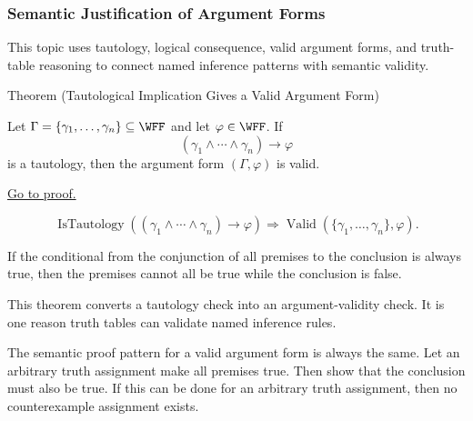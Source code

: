 \subsubsection*{Semantic Justification of Argument Forms}

\begin{remark*}
This topic uses tautology, logical consequence, valid argument forms, and
truth-table reasoning to connect named inference patterns with semantic
validity.
\end{remark*}

\begin{theorembox}{Theorem (Tautological Implication Gives a Valid Argument Form)}
\begin{theorem}
\label{thm:tautological-implication-valid-argument-form-propositional-logic}
Let \(\Gamma=\{\gamma_1,\ldots,\gamma_n\}\subseteq\WFF\) and let
\(\varphi\in\WFF\). If
\[
(\gamma_1\land\cdots\land\gamma_n)\to\varphi
\]
is a tautology, then the argument form \((\Gamma,\varphi)\) is valid.

\noindent\hyperref[prf:tautological-implication-valid-argument-form-propositional-logic]{Go to proof.}
\end{theorem}
\end{theorembox}

\begin{remark*}
\[
\operatorname{IsTautology}((\gamma_1\land\cdots\land\gamma_n)\to\varphi)
\Longrightarrow
\operatorname{Valid}(\{\gamma_1,
\ldots,\gamma_n\},\varphi).
\]
\end{remark*}



\begin{remark*}[Interpretation]
If the conditional from the conjunction of all premises to the conclusion is
always true, then the premises cannot all be true while the conclusion is false.

This theorem converts a tautology check into an argument-validity check. It is
one reason truth tables can validate named inference rules.
\end{remark*}

\begin{remark*}[Exposition]
The semantic proof pattern for a valid argument form is always the same. Let an
arbitrary truth assignment make all premises true. Then show that the conclusion
must also be true. If this can be done for an arbitrary truth assignment, then no
counterexample assignment exists.
\end{remark*}

